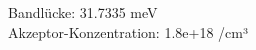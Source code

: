 
Bandlücke: 31.7335 meV\\
Akzeptor-Konzentration: 1.8e+18 /cm³\\

\begin{figure}[p]
\centering

\end{figure}

\begin{figure}[p]
\centering

\end{figure}